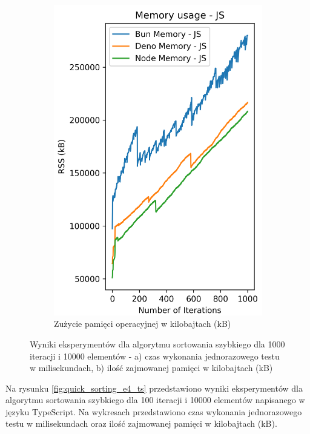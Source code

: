 \begin{figure}[H]
\begin{subfigure}[b]{0.42\textwidth}
    \includegraphics[width=\textwidth]{Figures/sorting/sorting_quick_1000_10000_js_memory.png}
    \caption{Zużycie pamięci operacyjnej w kilobajtach (kB)}
    \label{fig:quick_sorting_e4_memory}
  \end{subfigure}
  \caption{Wyniki eksperymentów dla algorytmu sortowania szybkiego dla 1000 iteracji i 10000 elementów - a) czas wykonania jednorazowego testu w milisekundach, b) ilość zajmowanej pamięci w kilobajtach (kB)}
  \label{fig:quick_sorting_e4}
\end{figure}
Na rysunku \ref{fig:quick_sorting_e4_ts} przedstawiono wyniki eksperymentów dla algorytmu sortowania szybkiego dla 100 iteracji i 10000 elementów napisanego w języku TypeScript. Na wykresach przedstawiono czas wykonania jednorazowego testu w milisekundach oraz ilość zajmowanej pamięci w kilobajtach (kB).

